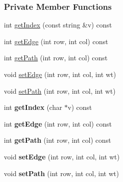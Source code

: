 \subsubsection*{Private Member Functions}
\begin{DoxyCompactItemize}
\item 
int \hyperlink{class_weighted_graph_a0c6d1c040128d1818ab3b38ff72723a4}{get\+Index} (const string \&v) const 
\item 
int \hyperlink{class_weighted_graph_aeda0f97771058c4ca642432cef88f52e}{get\+Edge} (int row, int col) const 
\item 
int \hyperlink{class_weighted_graph_a878188104e22c8ec0960d723ef4f58d9}{get\+Path} (int row, int col) const 
\item 
void \hyperlink{class_weighted_graph_aca51b1a746202621345709290a0ddd98}{set\+Edge} (int row, int col, int wt)
\item 
void \hyperlink{class_weighted_graph_a7872c78e6db2c55fc064b121303bb9d4}{set\+Path} (int row, int col, int wt)
\item 
int {\bfseries get\+Index} (char $\ast$v) const \hypertarget{class_weighted_graph_ababe06235c182b7e5278fcf4a627e143}{}\label{class_weighted_graph_ababe06235c182b7e5278fcf4a627e143}

\item 
int {\bfseries get\+Edge} (int row, int col) const \hypertarget{class_weighted_graph_aeda0f97771058c4ca642432cef88f52e}{}\label{class_weighted_graph_aeda0f97771058c4ca642432cef88f52e}

\item 
int {\bfseries get\+Path} (int row, int col) const \hypertarget{class_weighted_graph_a878188104e22c8ec0960d723ef4f58d9}{}\label{class_weighted_graph_a878188104e22c8ec0960d723ef4f58d9}

\item 
void {\bfseries set\+Edge} (int row, int col, int wt)\hypertarget{class_weighted_graph_aca51b1a746202621345709290a0ddd98}{}\label{class_weighted_graph_aca51b1a746202621345709290a0ddd98}

\item 
void {\bfseries set\+Path} (int row, int col, int wt)\hypertarget{class_weighted_graph_a7872c78e6db2c55fc064b121303bb9d4}{}\label{class_weighted_graph_a7872c78e6db2c55fc064b121303bb9d4}

\end{DoxyCompactItemize}
